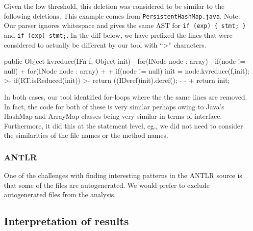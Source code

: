 Given the low threshold, this deletion was considered to be similar to the
following deletions. This example comes from {\tt PersistentHashMap.java}.
Note: Our parser ignores whitespace and gives the same AST for \verb|if (exp) { stmt; }|
and \verb|if (exp) stmt;|. In the diff below, we have prefixed the
lines that were considered to actually be different by our tool with ``>''
characters.

\begin{java}
 public Object kvreduce(IFn f, Object init){
-    for(INode node : array){
-        if(node != null){
+    for(INode node : array)
+        {
+        if(node != null)
             init = node.kvreduce(f,init);
>-                if(RT.isReduced(init))
>-                        return ((IDeref)init).deref();
-               }
-           }
+        }
     return init;
 }
\end{java}

In both cases, our tool identified for-loops where the the same lines are
removed. In fact, the code for both of these is very similar perhaps owing to
Java's HashMap and ArrayMap classes being very similar in terms of interface.
Furthermore, it did this at the statement level, eg., we did not need to
consider the similarities of the file names or the method names.

\subsubsection{ANTLR}

One of the challenges with finding interesting patterns in the ANTLR source is
that some of the files are autogenerated. We would prefer to exclude
autogenerated files from the analysis.

\subsection{Interpretation of results}

